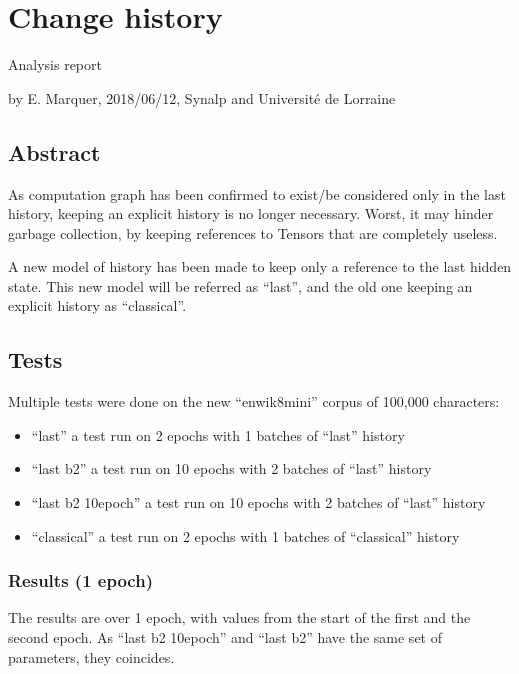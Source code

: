 \section*{Change history}

Analysis report

by E. Marquer, 2018/06/12, Synalp and Université de Lorraine

\subsection{Abstract}

As computation graph has been confirmed to exist/be considered only in
the last history, keeping an explicit history is no longer necessary.
Worst, it may hinder garbage collection, by keeping references to
Tensors that are completely useless.

A new model of history has been made to keep only a reference to the
last hidden state. This new model will be referred as ``last'', and the
old one keeping an explicit history as ``classical''.

\subsection{Tests}

Multiple tests were done on the new ``enwik8mini'' corpus of 100,000 characters:
\begin{itemize}
\item ``last'' a test run on 2 epochs with 1 batches of ``last'' history
\item ``last b2'' a test run on 10 epochs with 2 batches of ``last'' history
\item ``last b2 10epoch'' a test run on 10 epochs with 2 batches of ``last'' history
\item ``classical'' a test run on 2 epochs with 1 batches of ``classical'' history
\end{itemize}

\subsubsection{Results (1 epoch)}

The results are over 1 epoch, with values from the start of the first
and the second epoch. As ``last b2 10epoch'' and ``last b2'' have the
same set of parameters, they coincides.

